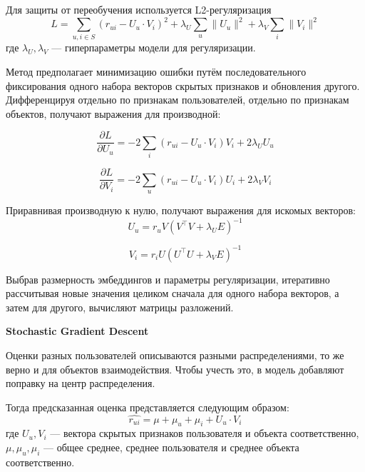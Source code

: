 Для защиты от переобучения используется L2-регуляризация~\cite{l-reg}
\begin{equation}\label{eq:3}
        L = \sum_{u, i\in S}{(r_{ui} - U_{u} \cdot V_{i}) ^ 2} + \lambda_{U}\sum_{u}{\|U_{u}\| ^ 2} + \lambda_{V}\sum_{i}{\|V_{i}\| ^ 2}
\end{equation}
где $\lambda_{U}, \lambda_{V}$ --- гиперпараметры модели для регуляризации.


Метод предполагает минимизацию ошибки путём последовательного фиксирования одного набора векторов скрытых признаков и обновления другого.
Дифференцируя отдельно по признакам пользователей, отдельно по признакам объектов, получают выражения для производной:

\begin{equation}\label{eq:4}
        \frac{\partial L}{\partial U_{u}} = -2\sum_{i}{(r_{ui} - U_{u} \cdot V_{i})V_{i} + 2 \lambda_{U}U_{u}}
\end{equation}

\begin{equation}\label{eq:5}
        \frac{\partial L}{\partial V_{i}} = -2\sum_{u}{(r_{ui} - U_{u} \cdot V_{i})U_{i} + 2 \lambda_{V}V_{i}}
\end{equation}

Приравнивая производную к нулю, получают выражения для искомых векторов:
\begin{equation}\label{eq:6}
        U_{u} = r_{u}V(V^\intercal V + \lambda_{U} E)^{-1}
\end{equation}

\begin{equation}\label{eq:7}
        V_{i} = r_{i}U(U^\intercal U + \lambda_{V} E)^{-1}
\end{equation}

Выбрав размерность эмбеддингов и параметры регуляризации, итеративно рассчитывая новые значения целиком сначала для одного набора векторов, а затем для другого, вычисляют матрицы разложений.


\vspace{1em}
\textbf{Stochastic Gradient Descent}

Оценки разных пользователей описываются разными распределениями, то же верно и для объектов взаимодействия.
Чтобы учесть это, в модель добавляют поправку на центр распределения.

Тогда предсказанная оценка представляется следующим образом:
\begin{equation}\label{eq:8}
    \hat{r_{ui}} = \mu + \mu_u + \mu_i+ U_{u} \cdot V_{i}
\end{equation}
где $U_{u}, V_{i}$ --- вектора скрытых признаков пользователя и объекта соответственно,
$\mu, \mu_u, \mu_i$ --- общее среднее, среднее пользователя и среднее объекта соответственно.


